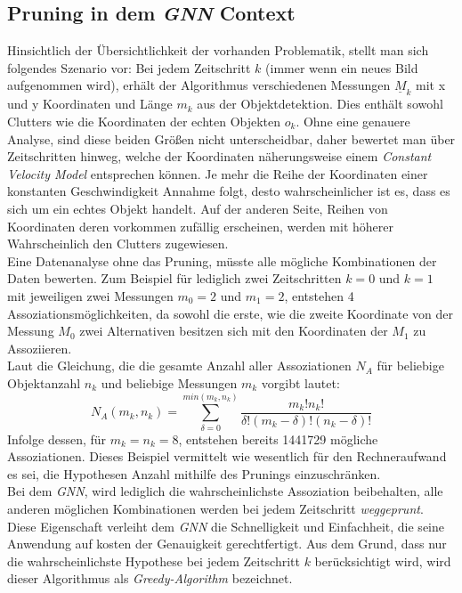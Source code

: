 \documentclass[10pt,a4paper]{article}
\begin{document}
\subsection{Pruning in dem \textit{GNN} Context}
Hinsichtlich der Übersichtlichkeit der vorhanden Problematik, stellt man sich folgendes Szenario vor: Bei jedem Zeitschritt $k$ (immer wenn ein neues Bild aufgenommen wird), erhält der Algorithmus verschiedenen Messungen $\underline{M}_k$ mit x und y Koordinaten und Länge $m_k$ aus der Objektdetektion. Dies enthält sowohl Clutters wie die Koordinaten der echten Objekten $o_k$. Ohne eine genauere Analyse, sind diese beiden Größen nicht unterscheidbar, daher bewertet man über Zeitschritten hinweg, welche der Koordinaten näherungsweise einem \textit{Constant Velocity Model} entsprechen können. Je mehr die Reihe der Koordinaten einer konstanten Geschwindigkeit Annahme folgt, desto wahrscheinlicher ist es, dass es sich um ein echtes Objekt handelt. Auf der anderen Seite, Reihen von 
Koordinaten deren vorkommen zufällig erscheinen, werden mit höherer Wahrscheinlich den Clutters zugewiesen.\\
Eine Datenanalyse ohne das Pruning, müsste alle mögliche Kombinationen der Daten bewerten. Zum Beispiel für lediglich zwei Zeitschritten $k =0$ und $k=1$ mit jeweiligen zwei Messungen  $m_0 = 2$ und $m_1 = 2$, entstehen 4 Assoziationsmöglichkeiten, da sowohl die erste, wie die zweite Koordinate von der Messung $M_0$ zwei Alternativen besitzen sich mit den Koordinaten der $M_1$ zu Assoziieren.\\
Laut \cite{MOTyoutube} die Gleichung, die die gesamte Anzahl aller Assoziationen $N_A$ für beliebige Objektanzahl $n_k$ und beliebige Messungen $m_k$ vorgibt lautet:
\begin{equation}
N_A(m_k,n_k) = \sum_{\delta=0}^{min(m_k,n_k)}\dfrac{m_k!n_k!}{\delta!(m_k-\delta)!(n_k-\delta)!}
\end{equation}
Infolge dessen, für $m_k=n_k = 8$, entstehen bereits 1441729 mögliche Assoziationen. Dieses Beispiel vermittelt wie wesentlich für den Rechneraufwand es sei, die Hypothesen Anzahl mithilfe des Prunings einzuschränken. \\
Bei dem \textit{GNN}, wird lediglich die wahrscheinlichste Assoziation beibehalten, alle anderen möglichen Kombinationen werden bei jedem Zeitschritt \textit{weggeprunt}. Diese Eigenschaft verleiht dem \textit{GNN} die Schnelligkeit und Einfachheit, die seine Anwendung auf kosten der Genauigkeit gerechtfertigt. Aus dem Grund, dass nur die wahrscheinlichste Hypothese bei jedem Zeitschritt $k$ berücksichtigt wird, wird dieser Algorithmus als \textit{Greedy-Algorithm} bezeichnet. \\
\end{document}
